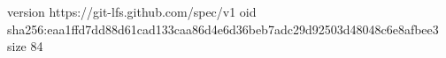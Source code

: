 version https://git-lfs.github.com/spec/v1
oid sha256:eaa1ffd7dd88d61cad133caa86d4e6d36beb7adc29d92503d48048c6e8afbee3
size 84
